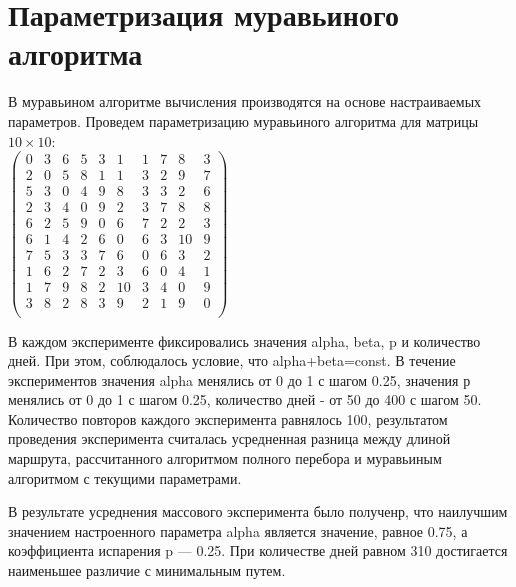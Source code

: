 \section{Параметризация муравьиного алгоритма}

В муравьином алгоритме вычисления производятся на основе настраиваемых параметров. Проведем параметризацию муравьиного алгоритма для матрицы $10\times10$:\\

$\begin{pmatrix}
	0 & 3 & 6 & 5 & 3 & 1 & 1 & 7 & 8 & 3\\
	2 & 0 & 5 & 8 & 1 & 1 & 3 & 2 & 9 & 7\\
	5 & 3 & 0 & 4 & 9 & 8 & 3 & 3 & 2 & 6\\
	2 & 3 & 4 & 0 & 9 & 2 & 3 & 7 & 8 & 8\\
	6 & 2 & 5 & 9 & 0 & 6 & 7 & 2 & 2 & 3\\
	6 & 1 & 4 & 2 & 6 & 0 & 6 & 3 & 10 & 9\\
	7 & 5 & 3 & 3 & 7 & 6 & 0 & 6 & 3 & 2\\
	1 & 6 & 2 & 7 & 2 & 3 & 6 & 0 & 4 & 1\\
	1 & 7 & 9 & 8 & 2 & 10 & 3 & 4 & 0 & 9\\
	3 & 8 & 2 & 8 & 3 & 9 & 2 & 1 & 9 & 0\\
\end{pmatrix}$

\vspace{\baselineskip}

В каждом эксперименте фиксировались значения alpha, beta, p и количество дней. При этом, соблюдалось условие, что alpha+beta=const. В течение экспериментов значения alpha менялись от 0 до 1 с шагом 0.25, значения р менялись от 0 до 1 с шагом 0.25, количество дней - от 50 до 400 с шагом 50. Количество повторов каждого эксперимента равнялось 100, результатом проведения эксперимента считалась усредненная разница между длиной маршрута, рассчитанного алгоритмом полного перебора и муравьиным алгоритмом с текущими параметрами.\\


В результате усреднения массового эксперимента было полученр, что наилучшим значением настроенного параметра alpha является значение, равное 0.75, а коэффициента испарения p — 0.25. При количестве дней равном 310 достигается наименьшее различие с минимальным путем.



